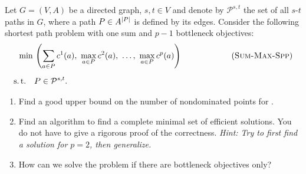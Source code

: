 \documentclass[11pt,english,a4paper,parskip=half-]{scrartcl}
\begin{document}
\maketitle

\inclass
\begin{exercise}{}
Let $G=(V,A)$ be a directed graph, $s, t \in V$ and denote by
$\mathcal P^{s,t}$ the set of all $s$-$t$ paths in $G$, where a path
$P \in A^{\left\lvert P \right\rvert}$ is defined by its edges.
Consider the following shortest path problem with one sum and $p-1$ bottleneck objectives:
\begin{align*}
\min \,&\left( \sum_{a \in P} c^{1}(a) , \ \max_{a \in P} c^{2}(a), \ \ldots , \ \max_{a \in P} c^{p}(a) \right) \qquad \qquad \tag{\algname{Sum-Max-Spp}}\\[1.2ex]
\text{s.\,t.}\quad & P \in \mathcal P^{s,t}.
\end{align*}
\begin{enumerate}
	\item Find a good upper bound on the number of nondominated points for .
        \item Find an algorithm to find a complete minimal set of efficient solutions. You do not have to give a rigorous proof of the correctness. \emph{Hint: Try to first find a solution for $p=2$, then generalize.}
        \item How can we solve the problem if there are bottleneck objectives only?
\end{enumerate}
\end{exercise}
\end{document}
